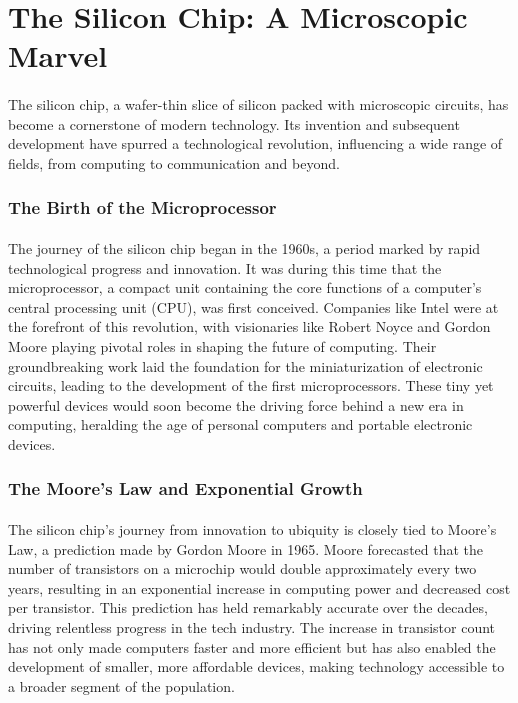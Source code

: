\documentclass{book}
\begin{document}
\section*{The Silicon Chip: A Microscopic Marvel}
\paragraph{}
The silicon chip, a wafer-thin slice of silicon packed with microscopic circuits, has become a cornerstone of modern technology. Its invention and subsequent development have spurred a technological revolution, influencing a wide range of fields, from computing to communication and beyond.

\subsubsection*{The Birth of the Microprocessor}
\paragraph{}
The journey of the silicon chip began in the 1960s, a period marked by rapid technological progress and innovation. It was during this time that the microprocessor, a compact unit containing the core functions of a computer's central processing unit (CPU), was first conceived. Companies like Intel were at the forefront of this revolution, with visionaries like Robert Noyce and Gordon Moore playing pivotal roles in shaping the future of computing. Their groundbreaking work laid the foundation for the miniaturization of electronic circuits, leading to the development of the first microprocessors. These tiny yet powerful devices would soon become the driving force behind a new era in computing, heralding the age of personal computers and portable electronic devices.

\subsubsection*{The Moore's Law and Exponential Growth}
\paragraph{}
The silicon chip's journey from innovation to ubiquity is closely tied to Moore's Law, a prediction made by Gordon Moore in 1965. Moore forecasted that the number of transistors on a microchip would double approximately every two years, resulting in an exponential increase in computing power and decreased cost per transistor. This prediction has held remarkably accurate over the decades, driving relentless progress in the tech industry. The increase in transistor count has not only made computers faster and more efficient but has also enabled the development of smaller, more affordable devices, making technology accessible to a broader segment of the population.
\end{document}
